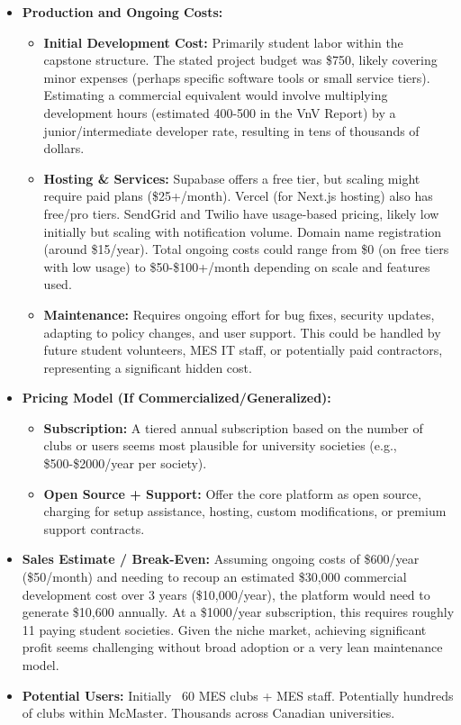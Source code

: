 \documentclass{article}
\begin{document}
\begin{itemize}
    \item \textbf{Production and Ongoing Costs:}
        \begin{itemize}
            \item \textbf{Initial Development Cost:} Primarily student labor within the capstone structure. The stated project budget was \$750, likely covering minor expenses (perhaps specific software tools or small service tiers). Estimating a commercial equivalent would involve multiplying development hours (estimated 400-500 in the VnV Report) by a junior/intermediate developer rate, resulting in tens of thousands of dollars.
            \item \textbf{Hosting \& Services:} Supabase offers a free tier, but scaling might require paid plans (\$25+/month). Vercel (for Next.js hosting) also has free/pro tiers. SendGrid and Twilio have usage-based pricing, likely low initially but scaling with notification volume. Domain name registration (around \$15/year). Total ongoing costs could range from \$0 (on free tiers with low usage) to \$50-\$100+/month depending on scale and features used.
            \item \textbf{Maintenance:} Requires ongoing effort for bug fixes, security updates, adapting to policy changes, and user support. This could be handled by future student volunteers, MES IT staff, or potentially paid contractors, representing a significant hidden cost.
        \end{itemize}

    \item \textbf{Pricing Model (If Commercialized/Generalized):}
        \begin{itemize}
            \item \textbf{Subscription:} A tiered annual subscription based on the number of clubs or users seems most plausible for university societies (e.g., \$500-\$2000/year per society).
            \item \textbf{Open Source + Support:} Offer the core platform as open source, charging for setup assistance, hosting, custom modifications, or premium support contracts.
        \end{itemize}

    \item \textbf{Sales Estimate / Break-Even:}
        Assuming ongoing costs of \$600/year (\$50/month) and needing to recoup an estimated \$30,000 commercial development cost over 3 years (\$10,000/year), the platform would need to generate \$10,600 annually. At a \$1000/year subscription, this requires roughly 11 paying student societies. Given the niche market, achieving significant profit seems challenging without broad adoption or a very lean maintenance model.

    \item \textbf{Potential Users:} Initially ~60 MES clubs + MES staff. Potentially hundreds of clubs within McMaster. Thousands across Canadian universities.
\end{itemize}
\end{document}

